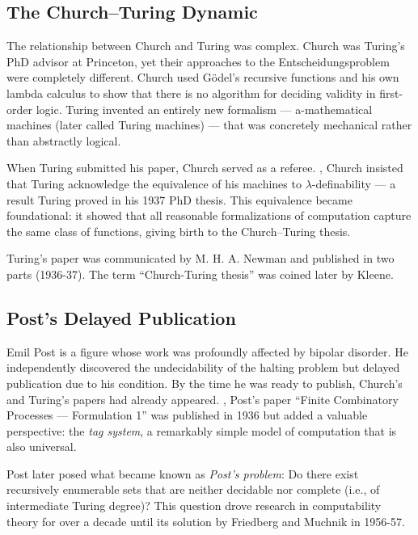 \subsection*{The Church--Turing Dynamic}

The relationship between Church and Turing was complex. Church was Turing's PhD advisor at Princeton, yet their approaches to the Entscheidungsproblem were completely different. Church used G\"odel's recursive functions and his own lambda calculus to show that there is no algorithm for deciding validity in first-order logic. Turing invented an entirely new formalism — a-mathematical machines (later called Turing machines) — that was concretely mechanical rather than abstractly logical.

When Turing submitted his paper, Church served as a referee. \cite{turing1937}, Church insisted that Turing acknowledge the equivalence of his machines to $\lambda$-definability — a result Turing proved in his 1937 PhD thesis. This equivalence became foundational: it showed that all reasonable formalizations of computation capture the same class of functions, giving birth to the Church--Turing thesis.

Turing's paper was communicated by M. H. A. Newman and published in two parts (1936-37). The term ``Church-Turing thesis'' was coined later by Kleene.

\subsection*{Post's Delayed Publication}

Emil Post is a figure whose work was profoundly affected by bipolar disorder. He independently discovered the undecidability of the halting problem but delayed publication due to his condition. By the time he was ready to publish, Church's and Turing's papers had already appeared. \cite{post1936}, Post's paper ``Finite Combinatory Processes — Formulation 1'' was published in 1936 but added a valuable perspective: the \emph{tag system}, a remarkably simple model of computation that is also universal.

Post later posed what became known as \emph{Post's problem}: Do there exist recursively enumerable sets that are neither decidable nor complete (i.e., of intermediate Turing degree)? This question drove research in computability theory for over a decade until its solution by Friedberg and Muchnik in 1956-57.

